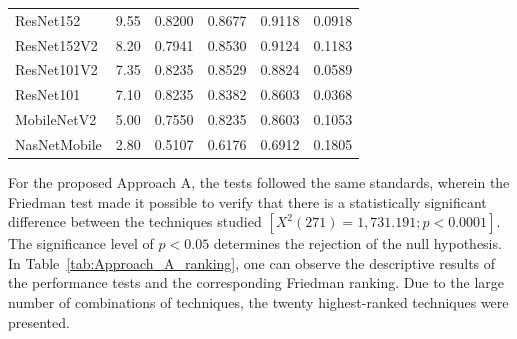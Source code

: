\documentclass[preprint,12pt]{elsarticle}
\begin{document}
\begin{table}[h!]
{\begin{tabular}{|l|c|c|c|c|c|}
			ResNet152 & 9.55 & 0.8200 & 0.8677 & 0.9118 & 0.0918 \\
			ResNet152V2 & 8.20 & 0.7941 & 0.8530 & 0.9124 & 0.1183 \\
			ResNet101V2 & 7.35 & 0.8235 & 0.8529 & 0.8824 & 0.0589 \\
			ResNet101 & 7.10 & 0.8235 & 0.8382 & 0.8603 & 0.0368 \\
			MobileNetV2 & 5.00 & 0.7550 & 0.8235 & 0.8603 & 0.1053 \\
			NasNetMobile & 2.80 & 0.5107 & 0.6176 & 0.6912 & 0.1805 \\
			\hline
		\end{tabular}
	}
\end{table}

For the proposed Approach A, the tests followed the same standards, wherein the Friedman test made it possible to verify that there is a statistically significant difference between the techniques studied $[X^2(271)=1,731.191; p<0.0001]$. The significance level of $p<0.05$ determines the rejection of the null hypothesis. In Table~\ref{tab:Approach_A_ranking}, one can observe the descriptive results of the performance tests and the corresponding Friedman ranking. Due to the large number of combinations of techniques, the twenty highest-ranked techniques were presented.
\end{document}

